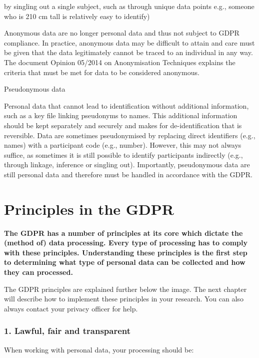 \documentclass[
]{book}
\begin{document}
by singling out a single subject, such as through unique data points
e.g., someone who is 210 cm tall is relatively easy to identify)

Anonymous data are no longer personal data and thus not subject to GDPR
compliance. In practice, anonymous data may be difficult to attain and care
must be given that the data legitimately cannot be traced to an individual in
any way. The document
Opinion 05/2014 on Anonymisation Techniques
explains the criteria that must be met for data to be considered anonymous.

Pseudonymous data

Personal data that cannot lead to identification without additional
information, such as a key file linking pseudonyms to names. This additional
information should be kept separately and securely and makes for
de-identification that is reversible. Data are sometimes pseudonymised by
replacing direct identifiers (e.g., names) with a participant code (e.g.,
number). However, this may not always suffice, as sometimes it is still
possible to identify participants indirectly (e.g., through linkage, inference
or singling out). Importantly, pseudonymous data are still personal data and
therefore must be handled in accordance with the GDPR.

\hypertarget{gdpr-principles}{%
\section{Principles in the GDPR}\label{gdpr-principles}}

\textbf{The GDPR has a number of principles at its core which dictate the (method of)
data processing. Every type of processing has to comply with these principles.
Understanding these principles is the first step to determining what type of
personal data can be collected and how they can processed.}

The GDPR principles are explained further below the image. The
next chapter will describe how to implement these
principles in your research. You can also always contact your
privacy officer for help.

\hypertarget{lawful-fair-and-transparent}{%
\subsubsection{1. Lawful, fair and transparent}\label{lawful-fair-and-transparent}}

When working with personal data, your processing should be:
\end{document}
